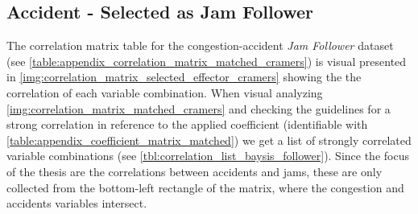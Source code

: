 \subsection{Accident - Selected as Jam Follower}
\label{analysis_processing_correlation_baysis_follower}
The correlation matrix table for the congestion-accident \textit{Jam Follower} dataset (see \cref{table:appendix_correlation_matrix_matched_cramers}) is visual presented in \cref{img:correlation_matrix_selected_effector_cramers} showing the the correlation of each variable combination. When visual analyzing \cref{img:correlation_matrix_matched_cramers} and checking the guidelines for a strong correlation in reference to the applied coefficient (identifiable with \cref{table:appendix_coefficient_matrix_matched}) we get a list of strongly correlated variable combinations (see \cref{tbl:correlation_list_baysis_follower}). Since the focus of the thesis are the correlations between accidents and jams, these are only collected from the bottom-left rectangle of the matrix, where the congestion and accidents variables intersect.

